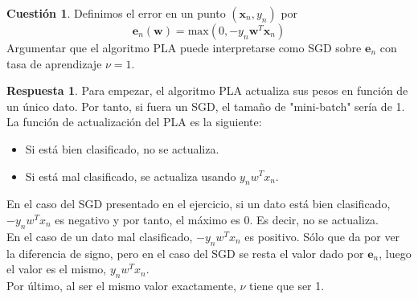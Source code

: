 \documentclass[10pt,a4paper]{article}
\theoremstyle{definition}
\newtheorem{cuestion}{Cuestión}
\newtheorem*{respuesta}{Respuesta}
\begin{document}
\begin{cuestion}
Definimos el error en un punto $(\mathbf{x}_n,y_n)$ por 
\[		\mathbf{e}_n(\mathbf{w})=\textrm{max}(0,-y_n\mathbf{w}^T\mathbf{x}_n)		\]
Argumentar que el algoritmo PLA puede interpretarse como SGD sobre $\mathbf{e}_n$ con tasa de aprendizaje $\nu=1$.
\end{cuestion}
\begin{respuesta}
Para empezar, el algoritmo PLA actualiza sus pesos en función de un único dato. Por tanto, si fuera un SGD, el tamaño de "mini-batch" sería de 1.\\

La función de actualización del PLA es la siguiente:\\
\begin{itemize}
\item Si está bien clasificado, no se actualiza.
\item Si está mal clasificado, se actualiza usando $y_nw^Tx_n$.
\end{itemize}
En el caso del SGD presentado en el ejercicio, si un dato está bien clasificado, $-y_nw^Tx_n$ es negativo y por tanto, el máximo es 0. Es decir, no se actualiza.\\

En el caso de un dato mal clasificado, $-y_nw^Tx_n$ es positivo. Sólo que da por ver la diferencia de signo, pero en el caso del SGD se resta el valor dado por $\mathbf{e}_n$, luego el valor es el mismo, $y_nw^Tx_n$.\\

Por último, al ser el mismo valor exactamente, $\nu$ tiene que ser 1.
\end{respuesta}
\end{document}
